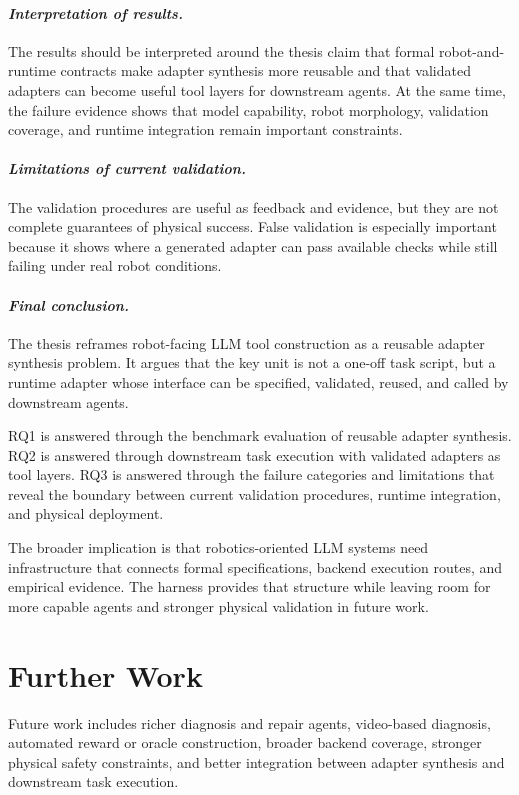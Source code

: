 \paragraph{\textit{Interpretation of results.}}
The results should be interpreted around the thesis claim that formal
robot-and-runtime contracts make adapter synthesis more reusable and that
validated adapters can become useful tool layers for downstream agents. At the
same time, the failure evidence shows that model capability, robot morphology,
validation coverage, and runtime integration remain important constraints.

\paragraph{\textit{Limitations of current validation.}}
The validation procedures are useful as feedback and evidence, but they are not
complete guarantees of physical success. False validation is especially
important because it shows where a generated adapter can pass available checks
while still failing under real robot conditions.

\paragraph{\textit{Final conclusion.}}
The thesis reframes robot-facing LLM tool construction as a reusable adapter
synthesis problem. It argues that the key unit is not a one-off task script,
but a runtime adapter whose interface can be specified, validated, reused, and
called by downstream agents.

RQ1 is answered through the benchmark evaluation of reusable adapter synthesis.
RQ2 is answered through downstream task execution with validated adapters as
tool layers. RQ3 is answered through the failure categories and limitations
that reveal the boundary between current validation procedures, runtime
integration, and physical deployment.

The broader implication is that robotics-oriented LLM systems need
infrastructure that connects formal specifications, backend execution routes,
and empirical evidence. The harness provides that structure while leaving room
for more capable agents and stronger physical validation in future work.

\section[Further Work]{Further Work}
Future work includes richer diagnosis and repair agents, video-based
diagnosis, automated reward or oracle construction, broader backend coverage,
stronger physical safety constraints, and better integration between adapter
synthesis and downstream task execution.
